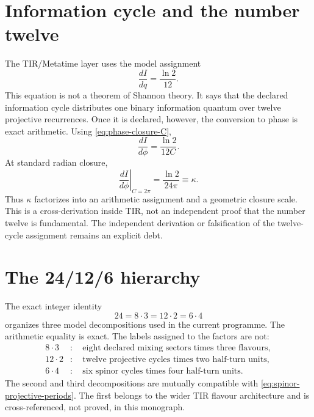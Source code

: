 \section{Information cycle and the number twelve}

The TIR/Metatime layer uses the model assignment
\begin{equation}
 \frac{dI}{dq}=\frac{\ln2}{12}.
 \label{eq:info-per-projective-turn-soh}
\end{equation}
This equation is not a theorem of Shannon theory.  It says that the declared
information cycle distributes one binary information quantum over twelve
projective recurrences.  Once it is declared, however, the conversion to phase
is exact arithmetic.  Using \eqref{eq:phase-closure-C},
\begin{equation}
 \frac{dI}{d\phi}
 =\frac{\ln2}{12C}.
 \label{eq:info-angular-density-C}
\end{equation}
At standard radian closure,
\begin{equation}
 \left.\frac{dI}{d\phi}\right|_{C=2\pi}
 =\frac{\ln2}{24\pi}
 \equiv\kappa.
 \label{eq:kappa-cycle-crosswalk}
\end{equation}
Thus $\kappa$ factorizes into an arithmetic assignment and a geometric closure
scale.  This is a cross-derivation inside TIR, not an independent proof that the
number twelve is fundamental.  The independent derivation or falsification of
the twelve-cycle assignment remains an explicit debt.

\section{The 24/12/6 hierarchy}

The exact integer identity
\begin{equation}
 24=8\cdot3=12\cdot2=6\cdot4
 \label{eq:24-factorizations-soh}
\end{equation}
organizes three model decompositions used in the current programme.  The
arithmetic equality is exact.  The labels assigned to the factors are not:
\begin{align}
 8\cdot3&:\quad\text{eight declared mixing sectors times three flavours},\\
 12\cdot2&:\quad\text{twelve projective cycles times two half-turn units},\\
 6\cdot4&:\quad\text{six spinor cycles times four half-turn units}.
\end{align}
The second and third decompositions are mutually compatible with
\cref{eq:spinor-projective-periods}.  The first belongs to the wider TIR flavour
architecture and is cross-referenced, not proved, in this monograph.

